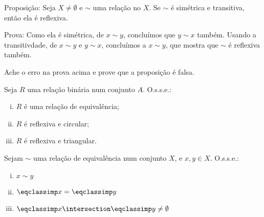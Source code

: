 \begin{exercise}
	Proposição: Seja $X \neq \emptyset$ e $\sim$ uma relação no $X$. Se $\sim$ é simétrica e transitiva, então ela é reflexiva.

	Prova: Como ela é simétrica, de $x \sim y$, concluímos que $y \sim x$ também. Usando a transitivdade, de $x \sim y$ e $y \sim x$, concluímos a $x \sim y$, que mostra que $\sim$ é reflexiva também.

	Ache o erro na prova acima e prove que a proposição é falsa.
\end{exercise}

\begin{exercise}
	Seja $R$ uma relação binária num conjunto $A$. O.s.s.e.:
	\begin{enumerate}[(i)]
		\item $R$ é uma relação de equivalência;
		\item $R$ é reflexiva e circular;
		\item $R$ é reflexiva e triangular.
	\end{enumerate}
\end{exercise}

\begin{exercise}
	Sejam $\sim$ uma relação de equivalência num conjunto $X$, e $x, y \in X$. O.s.s.e.:
	\begin{enumerate}[(i)]
		\item $x \sim y$
		\item $\eqclassimp x = \eqclassimp y$
		\item $\eqclassimp x \intersection \eqclassimp y \neq \emptyset$
	\end{enumerate}
\end{exercise}
